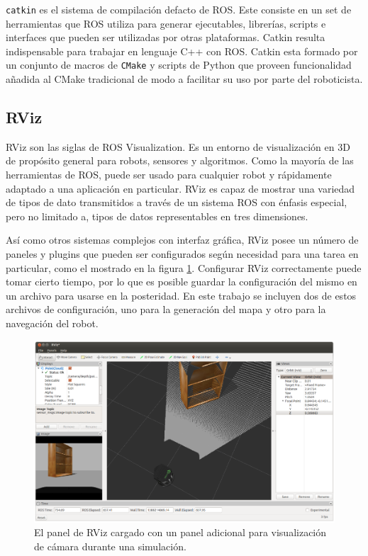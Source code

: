\texttt{catkin} es el sistema de compilación defacto de ROS. Este consiste en un set de herramientas que ROS utiliza para generar ejecutables, librerías, scripts e interfaces que pueden ser utilizadas por otras plataformas. Catkin resulta indispensable para trabajar en lenguaje C++ con ROS.
Catkin esta formado por un conjunto de macros de \texttt{CMake} y scripts de Python que proveen funcionalidad añadida al CMake tradicional de modo a facilitar su uso por parte del roboticista.

\subsection{RViz}

RViz son las siglas de ROS Visualization. Es un entorno de visualización en 3D de propósito general para robots, sensores y algoritmos. Como la mayoría de las herramientas de ROS, puede ser usado para cualquier robot y rápidamente adaptado a una aplicación en particular. RViz es capaz de mostrar una variedad de tipos de dato transmitidos a través de un sistema ROS con énfasis especial, pero no limitado a, tipos de datos representables en tres dimensiones.

Así como otros sistemas complejos con interfaz gráfica, RViz posee un número de paneles y plugins que pueden ser configurados según necesidad para una tarea en particular, como el mostrado en la figura \ref{fig:rvizScreenshot}. Configurar RViz correctamente puede tomar cierto tiempo, por lo que es posible guardar la configuración del mismo en un archivo para usarse en la posteridad. En este trabajo se incluyen dos de estos archivos de configuración, uno para la generación del mapa y otro para la navegación del robot.


\begin{figure}[ht]
    \centering
    \includegraphics[scale=.3]{./Figures/rviz_screenshot.png}
    \caption{El panel de RViz cargado con un panel adicional para visualización de cámara durante una simulación.}
    \label{fig:rvizScreenshot}
\end{figure}

